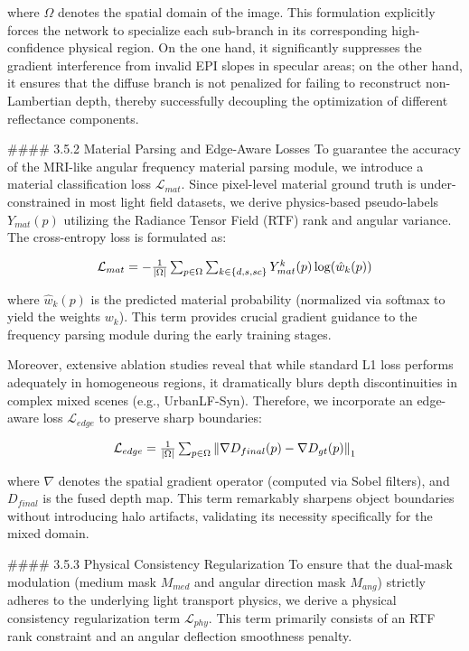 where $\Omega$ denotes the spatial domain of the image. This formulation explicitly forces the network to specialize each sub-branch in its corresponding high-confidence physical region. On the one hand, it significantly suppresses the gradient interference from invalid EPI slopes in specular areas; on the other hand, it ensures that the diffuse branch is not penalized for failing to reconstruct non-Lambertian depth, thereby successfully decoupling the optimization of different reflectance components.

\#\#\#\# 3.5.2 Material Parsing and Edge-Aware Losses
To guarantee the accuracy of the MRI-like angular frequency material parsing module, we introduce a material classification loss $\mathcal{L}_{mat}$. Since pixel-level material ground truth is under-constrained in most light field datasets, we derive physics-based pseudo-labels $Y_{mat}(p)$ utilizing the Radiance Tensor Field (RTF) rank and angular variance. The cross-entropy loss is formulated as:

\[
$$ \mathcal{L}_{mat} = - \frac{1}{|\Omega|} \sum_{p \in \Omega} \sum_{k \in \{d, s, sc\}} Y_{mat}^k(p) \log(\hat{w}_k(p)) $$
\]

where $\hat{w}_k(p)$ is the predicted material probability (normalized via softmax to yield the weights $w_k$). This term provides crucial gradient guidance to the frequency parsing module during the early training stages.

Moreover, extensive ablation studies reveal that while standard L1 loss performs adequately in homogeneous regions, it dramatically blurs depth discontinuities in complex mixed scenes (e.g., UrbanLF-Syn). Therefore, we incorporate an edge-aware loss $\mathcal{L}_{edge}$ to preserve sharp boundaries:

\[
$$ \mathcal{L}_{edge} = \frac{1}{|\Omega|} \sum_{p \in \Omega} \left\| \nabla D_{final}(p) - \nabla D_{gt}(p) \right\|_1 $$
\]

where $\nabla$ denotes the spatial gradient operator (computed via Sobel filters), and $D_{final}$ is the fused depth map. This term remarkably sharpens object boundaries without introducing halo artifacts, validating its necessity specifically for the mixed domain.

\#\#\#\# 3.5.3 Physical Consistency Regularization
To ensure that the dual-mask modulation (medium mask $M_{med}$ and angular direction mask $M_{ang}$) strictly adheres to the underlying light transport physics, we derive a physical consistency regularization term $\mathcal{L}_{phy}$. This term primarily consists of an RTF rank constraint and an angular deflection smoothness penalty.

